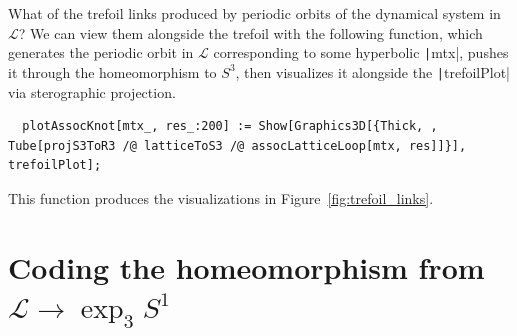 \documentclass[12pt,twoside]{reedthesis}
\theoremstyle{definition}
\newcommand{\LS}{\mathcal{L}}
\begin{document}
What of the trefoil links produced by periodic orbits of the dynamical system in $\LS$?
We can view them alongside the trefoil with the following function, which generates the periodic orbit in $\LS$ corresponding to some hyperbolic \texttt|mtx|, pushes it through the homeomorphism to $S^3$, then visualizes it alongside the \texttt|trefoilPlot| via sterographic projection.
\begin{verbatim}
  plotAssocKnot[mtx_, res_:200] := Show[Graphics3D[{Thick, , Tube[projS3ToR3 /@ latticeToS3 /@ assocLatticeLoop[mtx, res]]}], trefoilPlot];
\end{verbatim}
This function produces the visualizations in Figure~\ref{fig:trefoil_links}.

\section{Coding the homeomorphism from $\LS \to \exp_3 S^1$}\label{sec:coding_ls_to_exp}
\end{document}
